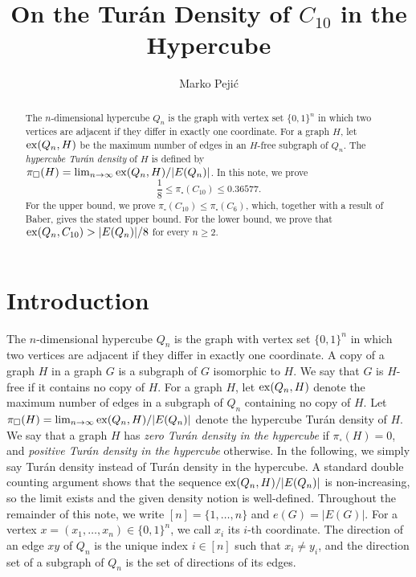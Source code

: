 \documentclass[11pt]{article}
\title{On the Tur\'an Density of $C_{10}$ in the Hypercube}
\author{Marko Peji\'c \affiliation{Karlsruhe Institute of Technology, Germany (\textsf{\href{mailto:marko.pejic@student.kit.edu}{marko.pejic@student.kit.edu}})}}
\theoremstyle{plain}
\theoremstyle{definition}
\newcommand{\ex}{{\rm ex}}
\begin{document}
\maketitle
\hypersetup{linkcolor=cred}

\newcommand{\etalchar}[1]{$^{#1}$}

\begin{abstract}

The $n$-dimensional hypercube $Q_n$ is the graph with vertex set $\{0,1\}^n$ in which two vertices are adjacent if they differ in exactly one coordinate. 
For a graph $H$, let $\ex(Q_n,H)$ be the maximum number of edges in an $H$-free subgraph of $Q_n$. 
The \emph{hypercube Tur\'an density} of $H$ is defined by $\pi_{\square}(H)=\lim_{n\rightarrow\infty}\ex(Q_n,H)/|E(Q_n)|$. 
In this note, we prove
\[
    \frac{1}{8} \leq \pi_{\square}(C_{10}) \leq 0.36577.
\]
For the upper bound, we prove $\pi_{\square}(C_{10}) \leq \pi_{\square}(C_6)$, which, together with a result of Baber, gives the stated upper bound. 
For the lower bound, we prove that $\ex(Q_n,C_{10}) > |E(Q_n)|/8$ for every $n \geq 2$. 

\end{abstract}

\section{Introduction}

The $n$-dimensional hypercube $Q_n$ is the graph with vertex set $\{0,1\}^n$ in which two vertices are adjacent if they differ in exactly one coordinate. 
A copy of a graph $H$ in a graph $G$ is a subgraph of $G$ isomorphic to $H$. 
We say that $G$ is $H$-free if it contains no copy of $H$. 
For a graph $H$, let $\ex(Q_n, H)$ denote the maximum number of edges in a subgraph of $Q_n$ containing no copy of $H$. 
Let $\pi_\square(H) = \lim_{n \rightarrow \infty} \ex(Q_n, H)/|E(Q_n)|$ denote the hypercube Tur\'an density of $H$. 
We say that a graph $H$ has {\it zero Tur\'an density in the hypercube} if $\pi_\square(H)=0$, and {\it positive Tur\'an density in the hypercube} otherwise. 
In the following, we simply say Tur\'an density instead of Tur\'an density in the hypercube. 
A standard double counting argument shows that the sequence $\ex(Q_n, H)/|E(Q_n)|$ is non-increasing, so the limit exists and the given density notion is well-defined. 
Throughout the remainder of this note, we write $[n] = \{1, \ldots, n\}$ and $e(G) = |E(G)|$. 
For a vertex $x= (x_1, \ldots, x_n) \in \{0,1\}^n$, we call $x_i$ its
$i$-th coordinate. 
The direction of an edge $xy$ of $Q_n$ is the unique index $i\in[n]$
such that $x_i\neq y_i$, and the direction set of a subgraph of $Q_n$
is the set of directions of its edges.
\end{document}
